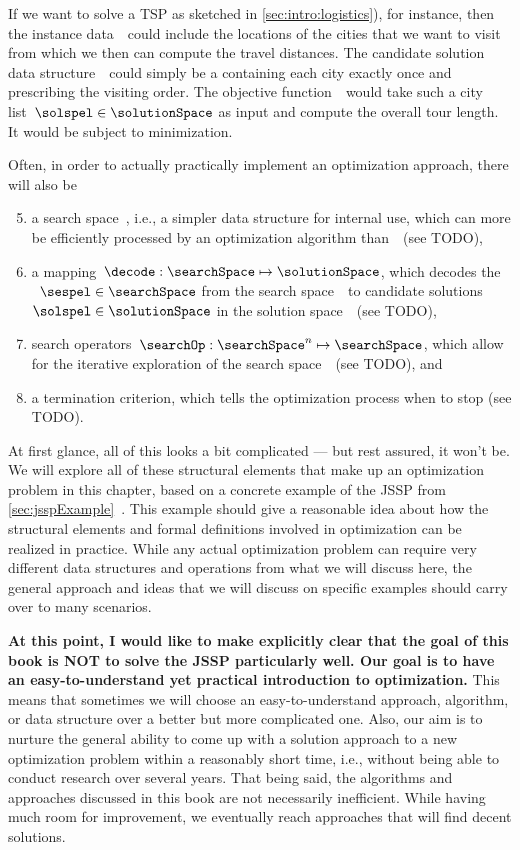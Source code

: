 %
If we want to solve a \gls{TSP} as sketched in \cref{sec:intro:logistics}), for instance, then the instance data~\instance\ could include the locations of the cities that we want to visit from which we then can compute the travel distances.
The candidate solution data structure~\solutionSpace\ could simply be a  containing each city exactly once and prescribing the visiting order.
The objective function~\objf\ would take such a city list~$\solspel\in\solutionSpace$ as input and compute the overall tour length.
It would be subject to minimization.

Often, in order to actually practically implement an optimization approach, there will also be%
%
\begin{enumerate}%
\setcounter{enumi}{4}%
%
\item a search space~\searchSpace, i.e., a simpler data structure for internal use, which can more be efficiently processed by an optimization algorithm than~\solutionSpace\ (see TODO),%
%
\item a mapping~$\decode:\searchSpace\mapsto\solutionSpace$, which decodes the ~$\sespel\in\searchSpace$ from the search space~\searchSpace\ to candidate solutions~$\solspel\in\solutionSpace$ in the solution space~\solutionSpace\ (see TODO),%
%
\item search operators~$\searchOp:\searchSpace^n\mapsto\searchSpace$, which allow for the iterative exploration of the search space~\searchSpace\ (see TODO), and%
%
\item a termination criterion, which tells the optimization process when to stop (see TODO).%
%
\end{enumerate}%
%
At first glance, all of this looks a bit complicated --- but rest assured, it won't be.
We will explore all of these structural elements that make up an optimization problem in this chapter, based on a concrete example of the \acrfull{JSSP} from \cref{sec:jsspExample}~\cite{GLLRK1979OAAIDSASAS,LLRKS1993SASAAC,L1982RRITTOMS,T1993BFBSP,BDP1996TJSSPCANST}.
This example should give a reasonable idea about how the structural elements and formal definitions involved in optimization can be realized in practice.
While any actual optimization problem can require very different data structures and operations from what we will discuss here, the general approach and ideas that we will discuss on specific examples should carry over to many scenarios.

\textbf{At this point, I would like to make explicitly clear that the goal of this book is NOT to solve the \gls{JSSP} particularly well. Our goal is to have an easy-to-understand yet practical introduction to optimization.}
This means that sometimes we will choose an easy-to-understand approach, algorithm, or data structure over a better but more complicated one.
Also, our aim is to nurture the general ability to come up with a solution approach to a new optimization problem within a reasonably short time, i.e., without being able to conduct research over several years.
That being said, the algorithms and approaches discussed in this book are not necessarily inefficient.
While having much room for improvement, we eventually reach approaches that will find decent solutions.%
\endhsection%
%
